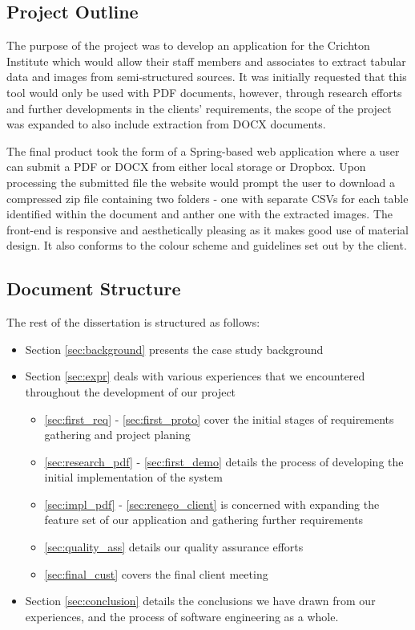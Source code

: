 \documentclass{l3proj}
\begin{document}
\subsection{Project Outline}
\label{outline}


The purpose of the project was to develop an application for the Crichton Institute which would allow their staff members and associates to extract tabular data and images from semi-structured sources. It was initially requested that this tool would only be used with PDF documents, however, through research efforts and further developments in the clients' requirements, the scope of the project was expanded to also include extraction from DOCX documents. 

The final product took the form of a Spring-based web application where a user can submit a PDF or DOCX from either local storage or Dropbox. Upon processing the submitted file the website would prompt the user to download a compressed zip file containing two folders - one with separate CSVs for each table identified within the document and anther one with the extracted images. The front-end is responsive and aesthetically pleasing as it makes good use of material design. It also conforms to the colour scheme and guidelines set out by the client. 

\subsection{Document Structure}
\label{structure}
The rest of the dissertation is structured as follows:
\begin{itemize}
    
    \item Section \ref{sec:background} presents the case study background 
    
    \item Section \ref{sec:expr} deals  with  various  experiences  that  we  encountered
throughout the development of our project
    \begin{itemize}
        \item \ref{sec:first_req} - \ref{sec:first_proto} cover the initial stages of requirements gathering and project planing
        \item \ref{sec:research_pdf} - \ref{sec:first_demo} details the process of developing the initial implementation of the system
        \item \ref{sec:impl_pdf} - \ref{sec:renego_client} is concerned with expanding the feature set of our application and gathering further requirements
        \item \ref{sec:quality_ass} details our quality assurance efforts
        \item \ref{sec:final_cust} covers the final client meeting
    \end{itemize}
    \item Section \ref{sec:conclusion} details the conclusions we have drawn from our experiences, and the process of software engineering as a whole.
\end{itemize}
\end{document}
